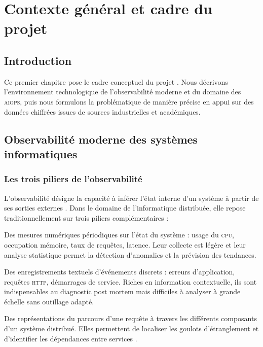 \chapter{Contexte général et cadre du projet}

\section*{Introduction}

Ce premier chapitre pose le cadre conceptuel du projet \caimp{}.
Nous décrivons l'environnement technologique de l'observabilité moderne et du
domaine des \textsc{aiops}, puis nous formulons la problématique de manière précise
en appui sur des données chiffrées issues de sources industrielles et académiques.

\section{Observabilité moderne des systèmes informatiques}

\subsection{Les trois piliers de l'observabilité}

L'observabilité désigne la capacité à inférer l'état interne d'un système à partir
de ses sorties externes \cite{brendangregg2020}. Dans le domaine de l'informatique
distribuée, elle repose traditionnellement sur trois piliers complémentaires :

\begin{description}[leftmargin=2cm, style=nextline]
  \item[Les métriques (\textit{metrics})] Des mesures numériques périodiques sur
    l'état du système : usage du \textsc{cpu}, occupation mémoire, taux de requêtes,
    latence. Leur collecte est légère et leur analyse statistique permet la détection
    d'anomalies et la prévision des tendances.

  \item[Les journaux (\textit{logs})] Des enregistrements textuels d'événements
    discrets : erreurs d'application, requêtes \textsc{http}, démarrages de service.
    Riches en information contextuelle, ils sont indispensables au diagnostic post
    mortem mais difficiles à analyser à grande échelle sans outillage adapté.

  \item[Les traces (\textit{traces})] Des représentations du parcours d'une requête
    à travers les différents composants d'un système distribué. Elles permettent de
    localiser les goulots d'étranglement et d'identifier les dépendances entre
    services \cite{sigelman2010dapper}.
\end{description}

